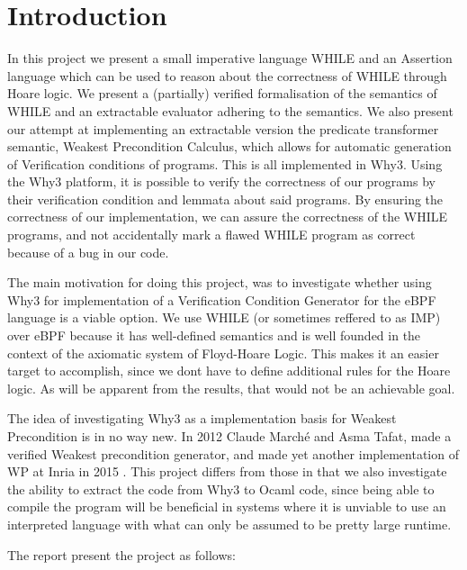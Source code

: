 \section{Introduction}

In this project we present a small imperative language WHILE and an Assertion language which can be used to reason about the correctness of WHILE through Hoare logic.
We present a (partially) verified formalisation of the semantics of WHILE and an extractable evaluator adhering to the semantics.
We also present our attempt at implementing an extractable version the predicate transformer semantic, Weakest Precondition Calculus, which allows for automatic generation of Verification conditions of programs.
This is all implemented in Why3.
Using the Why3 platform, it is possible to verify the correctness of our programs by their verification condition and lemmata about said programs. By ensuring the correctness of our implementation,
we can assure the correctness of the WHILE programs, and not accidentally mark a flawed WHILE program as correct
because of a bug in our code.

The main motivation for doing this project, was to investigate whether using Why3 for implementation of a Verification Condition Generator for the eBPF language is a viable option.
We use WHILE (or sometimes reffered to as IMP) over eBPF because it has well-defined semantics and is well founded in the context of the axiomatic system of Floyd-Hoare Logic.
This makes it an easier target to accomplish, since we dont have to define additional rules for the Hoare logic. As will be apparent from the results, that would not be an achievable goal.

The idea of investigating Why3 as a implementation basis for Weakest Precondition is in no way new.
In 2012 Claude Marché and Asma Tafat, made a verified Weakest precondition generator\cite{wp-revisited}, and made yet another implementation of WP at Inria in 2015 \cite{wp2}.
This project differs from those in that we also investigate the ability to extract the code from Why3 to Ocaml code,
since being able to compile the program will be beneficial in systems where it is unviable to use an interpreted language with what can only be assumed to be pretty large runtime.

The report present the project as follows:

